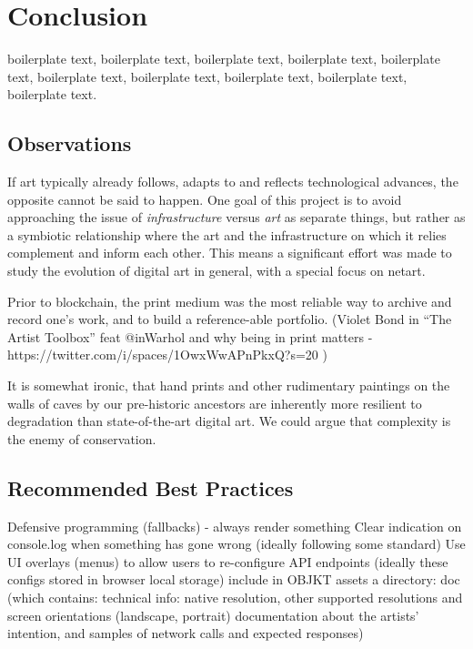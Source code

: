 \chapter{Conclusion}

\todo

boilerplate text, boilerplate text, boilerplate text, boilerplate text, boilerplate text, boilerplate text, boilerplate text, boilerplate text, boilerplate text, boilerplate text.


\section{Observations}

If art typically already follows, adapts to and reflects technological advances, the opposite cannot be said to happen. One goal of this project is to avoid approaching the issue of \emph{infrastructure} versus \emph{art} as separate things, but rather as a symbiotic relationship where the art and the infrastructure on which it relies complement and inform each other. This means a significant effort was made to study the evolution of digital art in general, with a special focus on netart. 

Prior to blockchain, the print medium was the most reliable way to archive and record one's work, and to build a reference-able portfolio. (Violet Bond in ``The Artist Toolbox'' feat @inWarhol and why being in print matters - https://twitter.com/i/spaces/1OwxWwAPnPkxQ?s=20 )

It is somewhat ironic, that hand prints and other rudimentary paintings on the walls of caves by our pre-historic ancestors are inherently more resilient to degradation than state-of-the-art digital art. We could argue that complexity is the enemy of conservation.


\section{Recommended Best Practices}


Defensive programming (fallbacks) - always render something
Clear indication on console.log when something has gone wrong (ideally following some standard)
Use UI overlays (menus) to allow users to re-configure API endpoints (ideally these configs stored in browser local storage)
include in OBJKT assets a directory: doc (which contains:
								technical info: native resolution, other supported resolutions and screen orientations (landscape, portrait)
								documentation about the artists' intention, and samples of network calls and expected responses)







